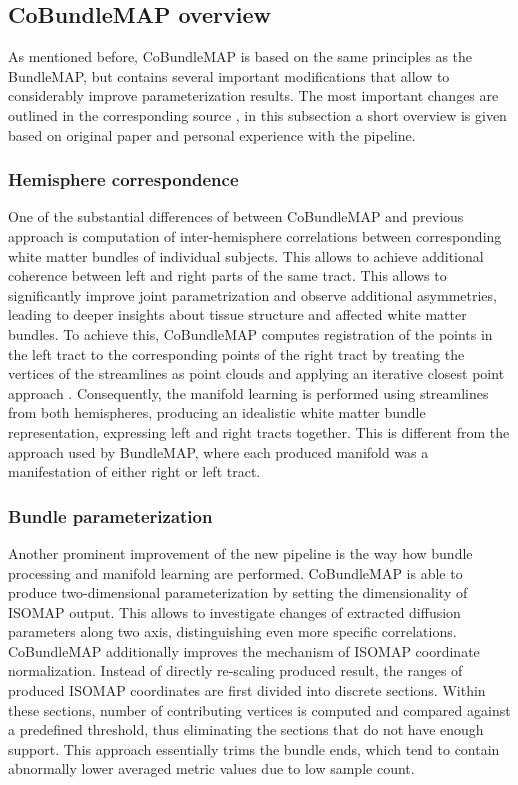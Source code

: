 \documentclass[thesis.tex]{subfiles}
\begin{document}
\subsection{CoBundleMAP overview}
As mentioned before, CoBundleMAP is based on the same principles as the BundleMAP, but contains several important modifications that allow to considerably improve parameterization results. The most important changes are outlined in the corresponding source \cite{Khatami2019CoBundleMap}, in this subsection a short overview is given based on original paper and personal experience with the pipeline.

\subsubsection{Hemisphere correspondence}
One of the substantial differences of between CoBundleMAP and previous approach is computation of inter-hemisphere correlations between corresponding white matter bundles of individual subjects. This allows to achieve additional coherence between left and right parts of the same tract. This allows to significantly improve joint parametrization and observe additional asymmetries, leading to deeper insights about tissue structure and affected white matter bundles. To achieve this, CoBundleMAP computes registration of the points in the left tract to the corresponding points of the right tract by treating the vertices of the streamlines as point clouds and applying an iterative closest point approach \cite{Khatami2019CoBundleMap}. Consequently, the manifold learning is performed using streamlines from both hemispheres, producing an idealistic white matter bundle representation, expressing left and right tracts together. This is different from the approach used by BundleMAP, where each produced manifold was a manifestation of either right or left tract.

\subsubsection{Bundle parameterization}
Another prominent improvement of the new pipeline is the way how bundle processing and manifold learning are performed. CoBundleMAP is able to produce two-dimensional parameterization by setting the dimensionality of ISOMAP output. This allows to investigate changes of extracted diffusion parameters along two axis, distinguishing even more specific correlations. CoBundleMAP additionally improves the
mechanism of ISOMAP coordinate normalization. Instead of directly re-scaling produced result, the ranges of produced ISOMAP coordinates are first divided into discrete sections. Within these sections, number of contributing vertices is computed and compared against a predefined threshold, thus eliminating the sections that do not have enough support. This approach essentially trims the bundle ends, which tend to contain abnormally lower averaged metric values due to low sample count.


\end{document}
